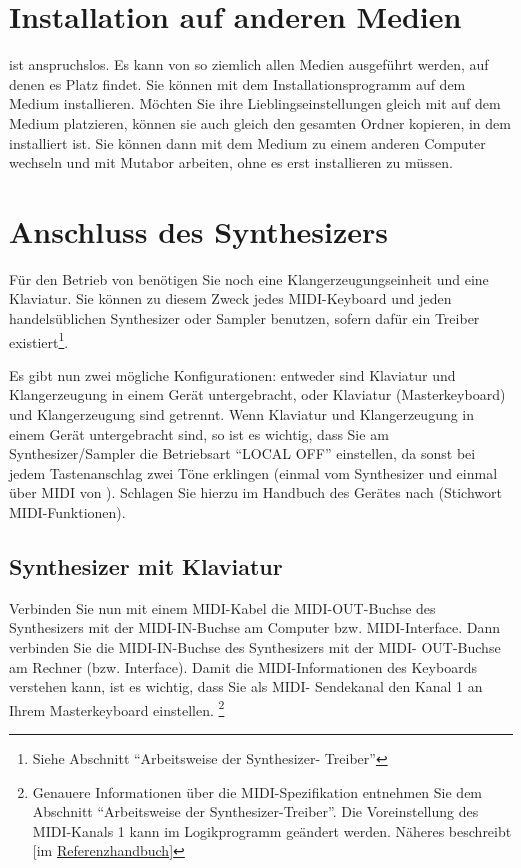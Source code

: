\section{Installation auf anderen Medien}\label{sec:inst-auf-ander}

\mutabor{} ist anspruchslos. Es kann von so ziemlich allen Medien
ausgeführt werden, auf denen es Platz findet. Sie können \mutabor{}
mit dem Installationsprogramm auf dem Medium installieren. Möchten Sie
ihre Lieblingseinstellungen gleich mit auf dem Medium platzieren,
können sie auch gleich den gesamten Ordner kopieren, in dem \mutabor{}
installiert ist. Sie können dann mit dem Medium zu einem anderen
Computer wechseln und mit Mutabor arbeiten, ohne es erst installieren
zu müssen.

\section{Anschluss des Synthesizers}\label{sec:anschl-des-synth}
\label{ANSCHLUSS}
Für den Betrieb von \mutabor{} benötigen Sie noch
eine Klangerzeugungseinheit und eine Klaviatur. Sie können zu
diesem Zweck jedes MIDI-Keyboard und jeden handelsüblichen
Synthesizer oder Sampler benutzen, sofern dafür ein Treiber
existiert\footnote{Siehe Abschnitt "`Arbeitsweise der Synthesizer-
Treiber"'}.

Es gibt nun zwei mögliche Konfigurationen: entweder sind Klaviatur
und Klangerzeugung in einem Gerät untergebracht, oder Klaviatur
(Masterkeyboard) und Klangerzeugung sind getrennt.
Wenn Klaviatur und Klang\-er\-zeu\-gung in einem Gerät untergebracht
sind, so ist es wichtig, dass Sie am Synthesizer/Sampler die
Betriebsart "`LOCAL OFF"' einstellen, da sonst bei jedem
Tastenanschlag zwei Töne erklingen (einmal vom Synthesizer und einmal über MIDI
von \mutabor{}). Schlagen Sie hierzu im Handbuch des Gerätes nach
(Stichwort MIDI-Funktionen).

\subsection{Synthesizer mit Klaviatur}\label{sec:synth-mit-klav}

Verbinden Sie nun mit einem MIDI-Kabel die MIDI-OUT-Buchse des
Synthesizers mit der MIDI-IN-Buchse am Computer bzw. MIDI-Interface.
Dann verbinden Sie die MIDI-IN-Buchse des Synthesizers mit der MIDI-
OUT-Buchse am Rechner (bzw. Interface).  Damit \mutabor{} die
MIDI-Informationen des Keyboards verstehen kann, ist es wichtig, dass
Sie als MIDI-  Sendekanal den Kanal 1 an Ihrem
Masterkeyboard einstellen.%
\footnote{Genauere Informationen über die MIDI-Spezifikation entnehmen
  Sie dem Abschnitt "`Arbeitsweise der Synthesizer-Treiber"'.  Die
  Voreinstellung des MIDI-Kanals 1 kann im Logikprogramm geändert
  werden. Näheres beschreibt
  [im \href{\makefilename{referenz}}{Referenzhandbuch}]}

